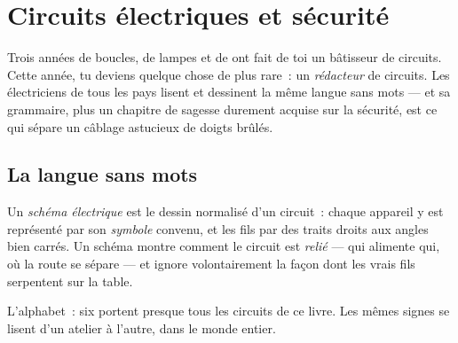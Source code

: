 \chapter{Circuits électriques et sécurité}\label{ch:g6:circuits-and-safety}

Trois années de boucles, de lampes et de  ont fait de toi un
bâtisseur de circuits. Cette année, tu deviens quelque chose de plus
rare~: un \emph{rédacteur} de circuits. Les électriciens de tous les
pays lisent et dessinent la même langue sans mots --- et sa
grammaire, plus un chapitre de sagesse durement acquise sur la
sécurité, est ce qui sépare un câblage astucieux de doigts brûlés.

\section{La langue sans mots}

\begin{definition}\label{def:g6:circuits-and-safety:diagram}
Un \emph{schéma électrique} est le dessin
normalisé d'un circuit~: chaque appareil y est représenté par son
\emph{symbole} convenu, et les fils par des traits
droits aux angles bien carrés. Un schéma montre comment le circuit
est \emph{relié} --- qui alimente qui, où la route se sépare --- et
ignore volontairement la façon dont les vrais fils serpentent sur la
table.
\end{definition}

\begin{omfigure}

{\small L'alphabet~: six  portent presque tous les circuits
de ce livre. Les mêmes signes se lisent d'un atelier à l'autre, dans
le monde entier.}
\end{omfigure}

